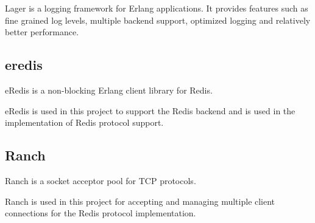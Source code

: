 Lager \citep{lager} is a logging framework for Erlang applications. It provides
features such as fine grained log levels, multiple backend support, optimized
logging and relatively better performance.

\subsection{eredis}

eRedis \citep{eredis} is a non-blocking Erlang client library for Redis.

eRedis is used in this project to support the Redis backend and is used in the
implementation of Redis protocol support.

\subsection{Ranch}

Ranch \citep{ranch} is a socket acceptor pool for TCP protocols.

Ranch is used in this project for accepting and managing multiple client 
connections for the Redis protocol implementation.


